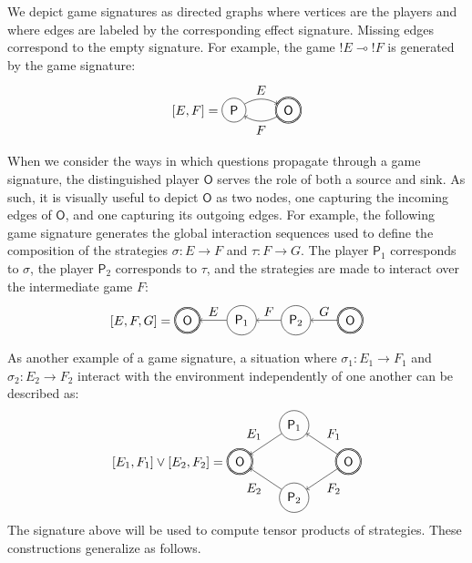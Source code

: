 \documentclass[11pt,oneside,draft]{book}
\theoremstyle{definition}
\newcommand{\kw}[1]{\ensuremath{ \mathsf{#1} }}
\begin{document}
We depict game signatures as directed graphs
where vertices are the players and
where edges are labeled by the corresponding effect signature.
Missing edges correspond to the empty signature.
For example,
the game ${!E} \multimap {!F}$ is generated by
the game signature:
\[
  [E,F] =
  \begin{tikzpicture}[baseline=(O.base),scale=1.5]
    \node[circle,draw,double] (O) at (0,0) {$\kw{O}$};
    \node[circle,draw] (P) at (-1,0) {$\kw{P}$};
    \path[->] (P) edge[bend left] node[above] {$E$} (O);
    \path[->] (O) edge[bend left] node[below] {$F$} (P);
  \end{tikzpicture}
\]

When we consider the ways in which questions propagate
through a game signature, %
the distinguished player $\kw{O}$ serves the role
of both a source and sink.
As such, it is visually useful
to depict $\kw{O}$ as two nodes,
one capturing the incoming edges of $\kw{O}$, and
one capturing its outgoing edges.
For example,
the following game signature
generates the global interaction sequences
used to define the composition
of the strategies
$\sigma : E \rightarrow F$ and $\tau : F \rightarrow G$.
The player $\kw{P}_1$ corresponds to $\sigma$,
the player $\kw{P}_2$ corresponds to $\tau$,
and the strategies are made to interact
over the intermediate game $F$:
\[
  [E,F,G] =
  \begin{tikzpicture}[baseline=(O1.base),scale=1.5]
    \node[circle,double,draw] (O1) at (0,0) {$\kw{O}$};
    \node[circle,draw] (P1) at (-1,0) {$\kw{P}_2$};
    \node[circle,draw] (P2) at (-2,0) {$\kw{P}_1$};
    \node[circle,double,draw] (O2) at (-3,0) {$\kw{O}$};
    \path[->] (O1) edge node[above] {$G$} (P1);
    \path[->] (P1) edge node[above] {$F$} (P2);
    \path[->] (P2) edge node[above] {$E$} (O2);
  \end{tikzpicture}
\]

As another example of a game signature,
a situation where
$\sigma_1 : E_1 \rightarrow F_1$ and
$\sigma_2 : E_2 \rightarrow F_2$
interact with the environment
independently of one another
can be described as:
\[
  [E_1,F_1] \vee [E_2,F_2] =
  \begin{tikzpicture}[baseline=(O.base),xscale=1.5]
    \node[circle,draw,double] (O1) at (+1,0) {$\kw{O}$};
    \node[circle,draw,double] (O2) at (-1,0) {$\kw{O}$};
    \node[circle,draw] (P1) at (0,+1) {$\kw{P}_1$};
    \node[circle,draw] (P2) at (0,-1) {$\kw{P}_2$};
    \path[->] (O1) edge node[auto=right] {$F_1$} (P1);
    \path[->] (P1) edge node[auto=right] {$E_1$} (O2);
    \path[->] (O1) edge node[auto=left] {$F_2$} (P2);
    \path[->] (P2) edge node[auto=left] {$E_2$} (O2);
  \end{tikzpicture}
\]
The signature above will be used to compute
tensor products of strategies.
These constructions generalize as follows.
\end{document}
